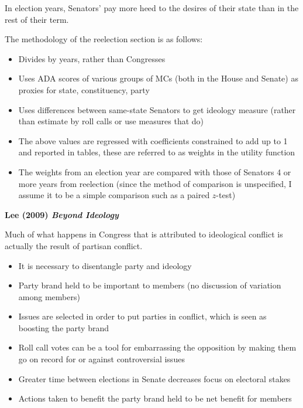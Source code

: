 \documentclass[12pt]{article}
\begin{document}
In election years, Senators' pay more heed to the desires of their state than in the rest of their term.

The methodology of the reelection section is as follows:
\begin{itemize}
	\item Divides by years, rather than Congresses
	
	\item Uses ADA scores of various groups of MCs (both in the House and Senate) as proxies for state, constituency, party
	
	\item Uses differences between same-state Senators to get ideology measure (rather than estimate by roll calls or use measures that do)
	
	\item The above values are regressed with coefficients constrained to add up to 1 and reported in tables, these are referred to as weights in the utility function
	
	\item The weights from an election year are compared with those of Senators 4 or more years from reelection (since the method of comparison is unspecified, I assume it to be a simple comparison such as a paired $z$-test)
\end{itemize}

\noindent
\textbf{Lee (2009) \textit{Beyond Ideology}}

Much of what happens in Congress that is attributed to ideological conflict is actually the result of partisan conflict.

\begin{itemize}	
	\item It is necessary to disentangle party and ideology
	
	\item Party brand held to be important to members (no discussion of variation among members)
	
	\item Issues are selected in order to put parties in conflict, which is seen as boosting the party brand
	
	\item Roll call votes can be a tool for embarrassing the opposition by making them go on record for or against controversial issues
	
	\item Greater time between elections in Senate decreases focus on electoral stakes
	
	\item Actions taken to benefit the party brand held to be net benefit for members
\end{itemize}
\end{document}
